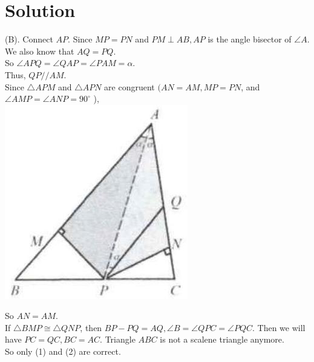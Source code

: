 \documentclass{article}
\begin{document}
\section*{Solution}
(B).
Connect \(A P\). Since \(M P=P N\) and \(P M \perp A B, A P\) is the angle bisector of \(\angle A\). We also know that \(A Q=P Q\).\\
So \(\angle A P Q=\angle Q A P=\angle P A M=\alpha\).\\
Thus, \(Q P / / A M\).\\
Since \(\triangle A P M\) and \(\triangle A P N\) are congruent \((A N=A M, M P=P N\), and \(\angle A M P=\angle A N P=90^{\circ}\) ),\\
\centering
\includegraphics[width=\textwidth]{images/reasoning_image_1.jpg}


So \(A N=A M\).\\
If \(\triangle B M P \cong \triangle Q N P\), then \(B P-P Q=A Q, \angle B=\angle Q P C=\angle P Q C\). Then we will have \(P C=Q C, B C=A C\). Triangle \(A B C\) is not a scalene triangle anymore.\\
So only (1) and (2) are correct.
\end{document}
